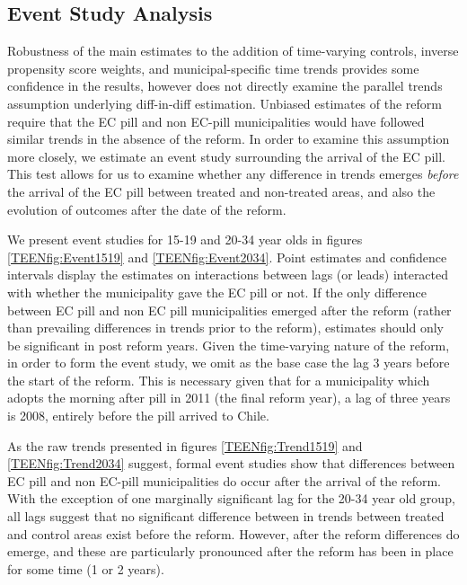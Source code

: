 \subsection{Event Study Analysis}
\label{TEENsscn:eventstudy}
Robustness of the main estimates to the addition of time-varying controls, 
inverse propensity score weights, and municipal-specific time trends provides 
some confidence in the results, however does not directly examine the
parallel trends assumption underlying diff-in-diff estimation.  Unbiased 
estimates of the reform require that the EC pill and non EC-pill municipalities 
would have followed similar trends in the absence of the reform.  In order to 
examine this assumption more closely, we estimate an event study surrounding the 
arrival of the EC pill.  This test allows for us to examine whether any 
difference in trends emerges \emph{before} the arrival of the EC pill between 
treated and non-treated areas, and also the evolution of outcomes after the date 
of the reform.

We present event studies for 15-19 and 20-34 year olds in figures 
\ref{TEENfig:Event1519} and \ref{TEENfig:Event2034}.  Point estimates and 
confidence intervals display the estimates on interactions between lags (or 
leads) interacted with whether the municipality gave the EC pill or not.  If the
only difference between EC pill and non EC pill municipalities emerged after the
reform (rather than prevailing differences in trends prior to the reform), 
estimates should only be significant in post reform years. Given the time-varying
nature of the reform, in order to form the event study, we omit as the base case
the lag 3 years before the start of the reform.  This is necessary given that for
a municipality which adopts the morning after pill in 2011 (the final reform 
year), a lag of three years is 2008, entirely before the pill arrived to Chile.

As the raw trends presented in figures \ref{TEENfig:Trend1519} and 
\ref{TEENfig:Trend2034} suggest, formal event studies show that differences 
between EC pill and non EC-pill municipalities do occur after the arrival of the
reform.  With the exception of one marginally significant lag for the 20-34 year
old group, all lags suggest that no significant difference between in trends
between treated and control areas exist before the reform.  However, after the
reform differences do emerge, and these are particularly pronounced after the
reform has been in place for some time (1 or 2 years).


